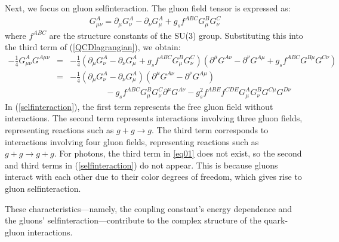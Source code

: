         Next, we focus on gluon selfinteraction. The gluon field tensor is expressed as:
        \begin{eqnarray}
        \label{eq01}
            G^A_{\mu\nu} = \partial_\mu G^A_\nu - \partial_\nu G^A_\mu + g_s f^{ABC}G^B_\mu G^C_\nu
        \end{eqnarray}  
        where $f^{ABC}$ are the structure constants of the SU(3) group. Substituting this into the third term of (\ref{QCDlagrangian}), we obtain:  
        \begin{eqnarray}
            \nonumber
            -\frac{1}{4}G^A_{\mu\nu} G^{A\mu\nu} &=& -\frac{1}{4}(\partial_\mu G^A_\nu - \partial_\nu G^A_\mu + g_s f^{ABC} G^B_\mu G^C_\nu)(\partial^\mu G^{A\nu} - \partial^{\nu} G^{A\mu} + g_s f^{ABC} G^{B\mu} G^{C\nu})\\ 
            \nonumber
            &=& -\frac{1}{4}(\partial_\mu G^A_\nu - \partial_\nu G^A_\mu)(\partial^\mu G^{A\nu} - \partial^{\nu} G^{A\mu}) \\
            \label{selfinteraction}
            && \qquad\qquad\ - g_s f^{ABC}G^B_\mu G^C_\nu \partial^\mu G^{A\nu} - g_s^2 f^{ABE}f^{CDE}G^A_\mu G^B_\nu G^{C\mu}G^{D\nu}
        \end{eqnarray}  
        In (\ref{selfinteraction}), the first term represents the free gluon field without interactions. The second term represents interactions involving three gluon fields, representing reactions such as $g+g \rightarrow g$. The third term corresponds to interactions involving four gluon fields, representing reactions such as $g+g \rightarrow g+g$. For photons, the third term in \eqref{eq01} does not exist, so the second and third terms in (\ref{selfinteraction}) do not appear. This is because gluons interact with each other due to their color degrees of freedom, which gives rise to gluon selfinteraction.

        These characteristics—namely, the coupling constant's energy dependence and the gluons' selfinteraction—contribute to the complex structure of the quark-gluon interactions.

